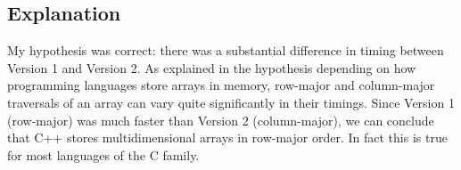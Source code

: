 \documentclass[11pt]{article}
\begin{document}
\subsection*{Explanation}

My hypothesis was correct: there was a substantial difference in timing between Version 1 and Version 2. As explained in the hypothesis depending on how programming languages store arrays in memory, row-major and column-major traversals of an array can vary quite significantly in their timings. Since Version 1 (row-major) was much faster than Version 2 (column-major), we can conclude that C++ stores multidimensional arrays in row-major order. In fact this is true for most languages of the C family.
\end{document}
